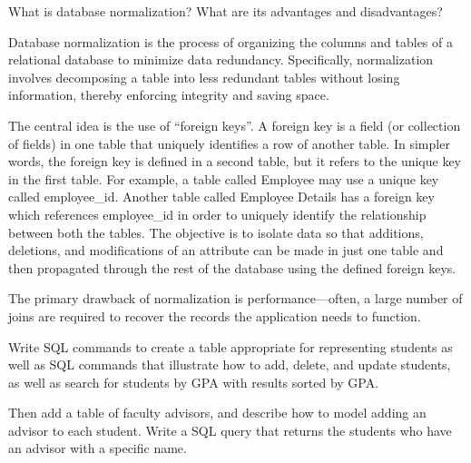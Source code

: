 \documentclass[10pt,openany,twoside,letterpaper,extrafontsizes]{memoir}
\begin{document}
\begin{Spacing}{\commonToolsSpacing}
\label{db-normalization}



%
What is database normalization? What are its advantages and disadvantages?


\label{solution-db-normalization}
Database normalization is the process of organizing the columns and
tables of a relational database to minimize data redundancy.
Specifically, normalization involves decomposing a table into less redundant
tables without losing information,
thereby enforcing integrity and saving space.

The central idea is the use of ``foreign keys''.
\label{foreign-key}
A foreign key is a field (or collection of fields) in one table that
uniquely identifies a row of another table.
In simpler words, the foreign key is defined in a second table, but it refers to the unique
key in the first table.
For example, a table called Employee may use a unique
key called employee\_id. Another table called Employee Details has a foreign key
which references employee\_id in order to uniquely identify the relationship
between both the tables.
The objective is to
isolate data so that additions, deletions, and modifications of an
attribute can be made in just one table and then propagated through
the rest of the database using the defined foreign keys.

The primary drawback of normalization is performance---often, a
large number of joins are required
to recover the records the application needs to function.
\ansend

\label{sql-design}




%
Write SQL commands to create a table appropriate for
representing students as well as SQL commands that
illustrate how to add, delete, and update students, as well
as search for students by
GPA with results sorted by GPA.

Then add a table of faculty advisors, and describe how to
model adding an advisor to each student. Write a SQL query that
returns the students who have an advisor with a specific name.


\end{Spacing}
\end{document}
